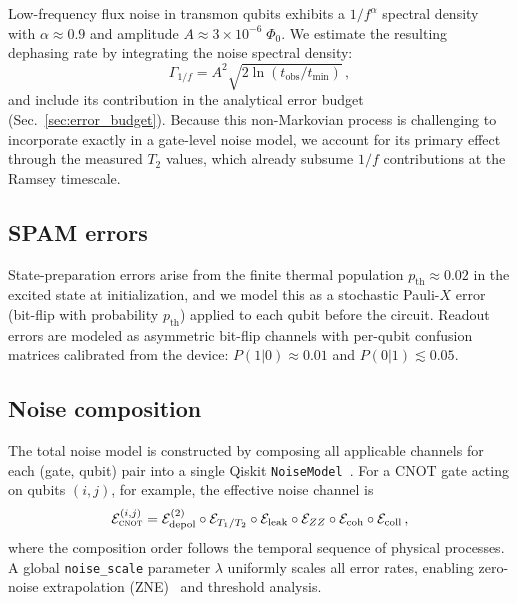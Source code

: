 \documentclass[aip, amsmath, amssymb, preprint, longbibliography]{revtex4-2}
\newcommand{\cnot}{\textsc{cnot}}
\begin{document}
Low-frequency flux noise in transmon qubits exhibits a $1/f^\alpha$
spectral density~\cite{Ithier2005,Paladino2014} with
$\alpha\approx0.9$ and amplitude $A\approx3\times10^{-6}\;\Phi_0$.
We estimate the resulting dephasing rate by integrating the noise
spectral density:
\begin{equation}
\Gamma_{1/f} = A^2\sqrt{2\ln(t_{\text{obs}}/t_{\min})}\,,
\label{eq:onef}
\end{equation}
and include its contribution in the analytical error budget
(Sec.~\ref{sec:error_budget}). Because this non-Markovian process is
challenging to incorporate exactly in a gate-level noise model, we account
for its primary effect through the measured $T_2$ values, which already
subsume $1/f$ contributions at the Ramsey timescale.

\subsection{SPAM errors}\label{sec:spam}

State-preparation errors arise from the finite thermal population
$p_{\text{th}}\approx0.02$ in the excited state at initialization, and
we model this as a stochastic Pauli-$X$ error (bit-flip with probability
$p_{\text{th}}$) applied to each qubit before the circuit.
Readout errors are modeled as asymmetric bit-flip channels with
per-qubit confusion matrices calibrated from the device:
$P(1|0)\approx0.01$ and $P(0|1)\lesssim0.05$.

\subsection{Noise composition}\label{sec:composition}

The total noise model is constructed by composing all applicable channels
for each (gate, qubit) pair into a single Qiskit
\texttt{NoiseModel}~\cite{Aer2024}. For a CNOT gate acting on qubits
$(i,j)$, for example, the effective noise channel is
\begin{equation}
\mathcal{E}_{\cnot}^{(i,j)} = \mathcal{E}_{\text{depol}}^{(2)}
\circ\mathcal{E}_{T_1/T_2}\circ\mathcal{E}_{\text{leak}}
\circ\mathcal{E}_{ZZ}\circ\mathcal{E}_{\text{coh}}
\circ\mathcal{E}_{\text{coll}}\,,
\end{equation}
where the composition order follows the temporal sequence of physical
processes. A global \texttt{noise\_scale} parameter $\lambda$ uniformly
scales all error rates, enabling zero-noise extrapolation
(ZNE)~\cite{Temme2017,Li2017} and threshold analysis.
\end{document}
